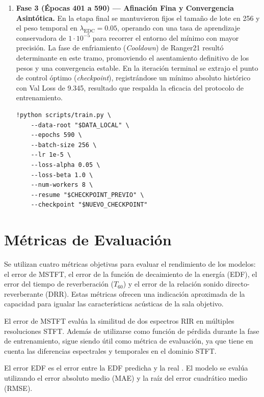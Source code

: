 \begin{enumerate}
\item \textbf{Fase 3 (Épocas 401 a 590) --- Afinación Fina y Convergencia Asintótica.}
En la etapa final se mantuvieron fijos el tamaño de lote en 256 y el peso temporal en $\lambda_{\mathrm{EDC}}=0.05$, operando con una tasa de aprendizaje conservadora de $1\cdot 10^{-5}$ para recorrer el entorno del mínimo con mayor precisión. La fase de enfriamiento (\textit{Cooldown}) de Ranger21 resultó determinante en este tramo, promoviendo el asentamiento definitivo de los pesos y una convergencia estable. En la iteración terminal se extrajo el punto de control óptimo (\textit{checkpoint}), registrándose un mínimo absoluto histórico con Val Loss de 9.345, resultado que respalda la eficacia del protocolo de entrenamiento.

\begin{lstlisting}[style=pythoncell,caption={Ejecución de entrenamiento correspondiente a la Fase 3 (pulido final).},label={lst:fase3_train}]
!python scripts/train.py \
	--data-root "$DATA_LOCAL" \
	--epochs 590 \
	--batch-size 256 \
	--lr 1e-5 \
	--loss-alpha 0.05 \
	--loss-beta 1.0 \
	--num-workers 8 \
	--resume "$CHECKPOINT_PREVIO" \
	--checkpoint "$NUEVO_CHECKPOINT"
\end{lstlisting}
\end{enumerate}

\section{Métricas de Evaluación}

Se utilizan cuatro métricas objetivas para evaluar el rendimiento de los modelos: el error de MSTFT, el error de la función de decaimiento de la energía (EDF), el error del tiempo de reverberación ($T_{60}$) y el error de la relación sonido directo-reverberante (DRR). Estas métricas ofrecen una indicación aproximada de la capacidad para igualar las características acústicas de la sala objetivo.

El error de MSTFT evalúa la similitud de dos espectros RIR en múltiples resoluciones STFT. Además de utilizarse como función de pérdida durante la fase de entrenamiento, sigue siendo útil como métrica de evaluación, ya que tiene en cuenta las diferencias espectrales y temporales en el dominio STFT. 

El error EDF es el error entre la EDF predicha y la real \cite{Steinmetz2021FiNS}. El modelo se evalúa utilizando el error absoluto medio (MAE) y la raíz del error cuadrático medio (RMSE).

